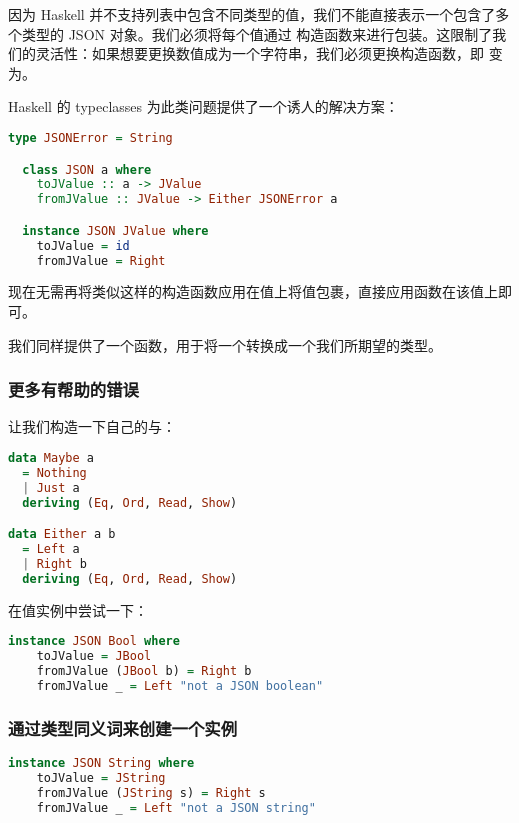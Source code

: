 \documentclass[./main.tex]{subfiles}
\begin{document}
因为 Haskell 并不支持列表中包含不同类型的值，我们不能直接表示一个包含了多个类型的 JSON 对象。我们必须将每个值通过
构造函数来进行包装。这限制了我们的灵活性：如果想要更换数值成为一个字符串，我们必须更换构造函数，即
变为。

Haskell 的 typeclasses 为此类问题提供了一个诱人的解决方案：

\begin{lstlisting}[language=Haskell]
  type JSONError = String

  class JSON a where
    toJValue :: a -> JValue
    fromJValue :: JValue -> Either JSONError a

  instance JSON JValue where
    toJValue = id
    fromJValue = Right
\end{lstlisting}

现在无需再将类似这样的构造函数应用在值上将值包裹，直接应用函数在该值上即可。

我们同样提供了一个函数，用于将一个转换成一个我们所期望的类型。

\subsubsection*{更多有帮助的错误}

让我们构造一下自己的与：

\begin{lstlisting}[language=Haskell]
  data Maybe a
  = Nothing
  | Just a
  deriving (Eq, Ord, Read, Show)

data Either a b
  = Left a
  | Right b
  deriving (Eq, Ord, Read, Show)
\end{lstlisting}

在值实例中尝试一下：

\begin{lstlisting}[language=Haskell]
  instance JSON Bool where
    toJValue = JBool
    fromJValue (JBool b) = Right b
    fromJValue _ = Left "not a JSON boolean"
\end{lstlisting}

\subsubsection*{通过类型同义词来创建一个实例}

\begin{lstlisting}[language=Haskell]
  instance JSON String where
    toJValue = JString
    fromJValue (JString s) = Right s
    fromJValue _ = Left "not a JSON string"
\end{lstlisting}
\end{document}
